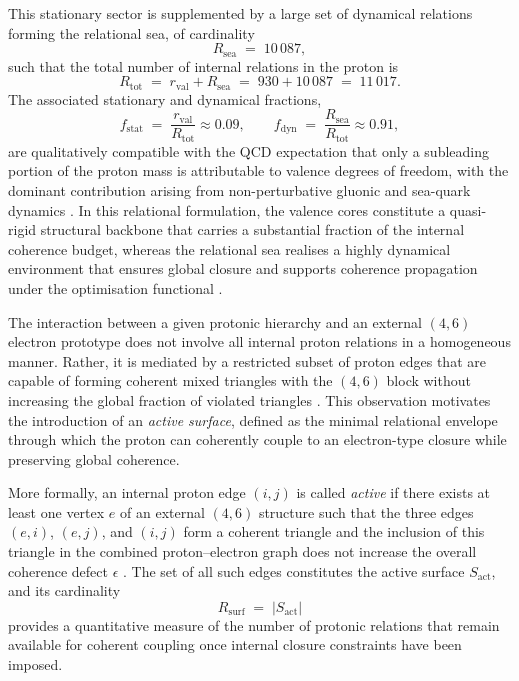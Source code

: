 \documentclass[11pt,a4paper]{article}
\numberwithin{equation}{section}
\begin{document}
This stationary sector is supplemented by a large set of dynamical relations forming the relational sea, of cardinality
\begin{equation}
  R_{\mathrm{sea}} \;=\; 10\,087,
\end{equation}
such that the total number of internal relations in the proton is
\begin{equation}
  R_{\mathrm{tot}} \;=\; r_{\mathrm{val}} + R_{\mathrm{sea}} \;=\; 930 + 10\,087 \;=\; 11\,017.
\end{equation}
The associated stationary and dynamical fractions,
\begin{equation}
  f_{\mathrm{stat}} \;=\; \frac{r_{\mathrm{val}}}{R_{\mathrm{tot}}} \approx 0.09,
  \qquad
  f_{\mathrm{dyn}} \;=\; \frac{R_{\mathrm{sea}}}{R_{\mathrm{tot}}} \approx 0.91,
\end{equation}
are qualitatively compatible with the QCD expectation that only a subleading portion of the proton mass is attributable to valence degrees of freedom, with the dominant contribution arising from non-perturbative gluonic and sea-quark dynamics \cite{AmslerQCDProton,LaubscherIMRadPDL2026}. In this relational formulation, the valence cores constitute a quasi-rigid structural backbone that carries a substantial fraction of the internal coherence budget, whereas the relational sea realises a highly dynamical environment that ensures global closure and supports coherence propagation under the optimisation functional \cite{LaubscherPDLFull2026,LaubscherLDP2026,LaubscherCombinatorialProton2026}.

The interaction between a given protonic hierarchy and an external $(4,6)$ electron prototype does not involve all internal proton relations in a homogeneous manner. Rather, it is mediated by a restricted subset of proton edges that are capable of forming coherent mixed triangles with the $(4,6)$ block without increasing the global fraction of violated triangles \cite{LaubscherDerivationAlpha2026,LaubscherGoldenRatioPDL2026}. This observation motivates the introduction of an \emph{active surface}, defined as the minimal relational envelope through which the proton can coherently couple to an electron-type closure while preserving global coherence.

More formally, an internal proton edge $(i,j)$ is called \emph{active} if there exists at least one vertex $e$ of an external $(4,6)$ structure such that the three edges $(e,i)$, $(e,j)$, and $(i,j)$ form a coherent triangle and the inclusion of this triangle in the combined proton–electron graph does not increase the overall coherence defect $\epsilon$ \cite{LaubscherDerivationAlpha2026}. The set of all such edges constitutes the active surface $S_{\mathrm{act}}$, and its cardinality
\begin{equation}
  R_{\mathrm{surf}} \;=\; |S_{\mathrm{act}}|
\end{equation}
provides a quantitative measure of the number of protonic relations that remain available for coherent coupling once internal closure constraints have been imposed.
\end{document}

